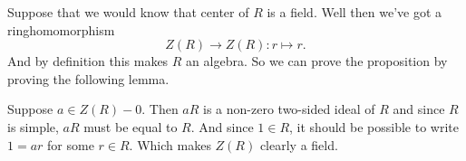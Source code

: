 Suppose that we would know that center of $R$ is a field. Well then we've got a ringhomomorphism 
\[Z(R) \to Z(R) : r \mapsto r .\]
And by definition this makes $R$ an algebra. So we can prove the proposition by proving the following lemma. 


Suppose $a\in Z(R)-{0}$. Then $aR$ is a non-zero two-sided ideal of $R$ and since $R$ is simple, $aR$ must be equal to $R$. And since $1 \in R$, it should be possible to write $1 = ar$ for some $r\in R$. Which makes $Z(R)$ clearly a field. 